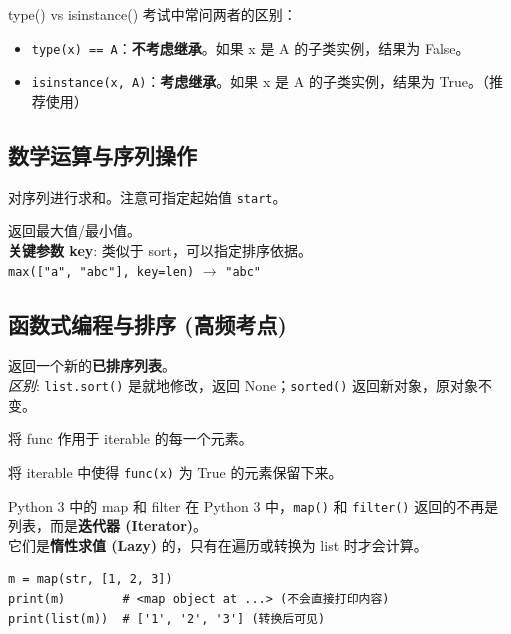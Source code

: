 \documentclass[12pt, a4paper]{article}
\begin{document}
\begin{importantbox}{type() vs isinstance()}
考试中常问两者的区别：
\begin{itemize}
    \item \texttt{type(x) == A}：\textbf{不考虑继承}。如果 x 是 A 的子类实例，结果为 False。
    \item \texttt{isinstance(x, A)}：\textbf{考虑继承}。如果 x 是 A 的子类实例，结果为 True。（推荐使用）
\end{itemize}
\end{importantbox}

\subsection{数学运算与序列操作}

\begin{description}[style=multiline, leftmargin=3cm]
    \item[sum] 对序列进行求和。注意可指定起始值 \texttt{start}。
    \item[max/min] 返回最大值/最小值。
    \\ \textbf{关键参数 key}: 类似于 sort，可以指定排序依据。
    \\ \texttt{max(["a", "abc"], key=len)} $\to$ \texttt{"abc"}
\end{description}

\subsection{函数式编程与排序 (高频考点)}

\begin{description}[style=multiline, leftmargin=3cm]
    \item[sorted] 
    返回一个新的\textbf{已排序列表}。
    \\ \textit{区别}: \texttt{list.sort()} 是就地修改，返回 None；\texttt{sorted()} 返回新对象，原对象不变。

    \item[map] 
    将 func 作用于 iterable 的每一个元素。

    \item[filter] 
    将 iterable 中使得 \texttt{func(x)} 为 True 的元素保留下来。
\end{description}

\begin{trapbox}{Python 3 中的 map 和 filter}
在 Python 3 中，\texttt{map()} 和 \texttt{filter()} 返回的不再是列表，而是\textbf{迭代器 (Iterator)}。
\\ 它们是\textbf{惰性求值 (Lazy)} 的，只有在遍历或转换为 list 时才会计算。
\begin{lstlisting}
m = map(str, [1, 2, 3])
print(m)        # <map object at ...> (不会直接打印内容)
print(list(m))  # ['1', '2', '3'] (转换后可见)
\end{lstlisting}
\end{trapbox}
\end{document}

